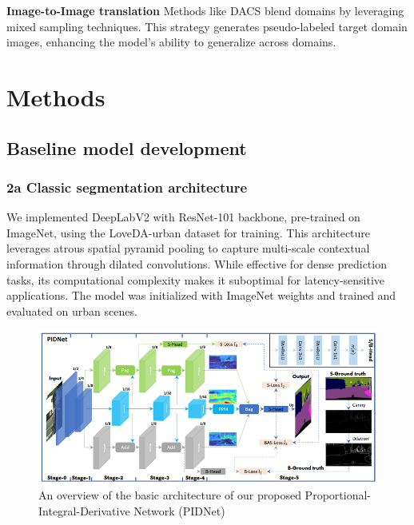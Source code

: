 \documentclass{article}
\begin{document}
\begin{multicols}{2}
		\textbf{Image-to-Image translation}
		Methods like DACS \cite{tranheden2021dacs} blend domains by leveraging mixed sampling techniques. This strategy generates pseudo-labeled target domain images, enhancing the model's ability to generalize across domains.

				
		
\section{Methods}
\subsection{Baseline model development}
\subsubsection{2a Classic segmentation architecture } 
We implemented DeepLabV2  \cite{chen2018deeplab}  with ResNet-101 backbone, pre-trained on ImageNet, using the LoveDA-urban dataset for training. This architecture leverages atrous spatial pyramid pooling to capture multi-scale contextual information through dilated convolutions. While effective for dense prediction tasks, its computational complexity makes it suboptimal for latency-sensitive applications. The model was initialized with ImageNet weights and trained and evaluated on urban scenes.
\end{multicols}


\begin{figure}[H]
	\centering
	\includegraphics[width=1\linewidth]{image/general/PIDNET.png}
	\caption{An overview of the basic architecture of our proposed Proportional-Integral-Derivative Network (PIDNet)}
	\label{fig:PIDNET_image}
\end{figure}
\end{document}
